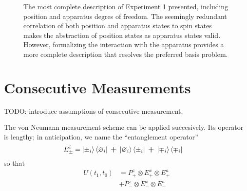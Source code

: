 \begin{figure}
\centering\CaptionFontSize
{}
\caption[Insert an abbreviated caption here to show in the List of Figures]
{The most complete description of Experiment 1 presented, including position and apparatus degres of freedom. The seemingly redundant correlation of both position and apparatus states to spin states makes the abstraction of position states as apparatus states valid. However, formalizing the interaction with the apparatus provides a more complete description that resolves the preferred basis problem.}
\label{Figure:Measurement:DetectorStates}
\end{figure}

\section{Consecutive Measurements}
TODO: introduce assumptions of consecutive measurement.

The von Neumann measurement scheme can be applied succesively. Its operator is lengthy; in anticipation, we name the ``entanglement operator''
\begin{align}
  E^i_\pm &= \ket{\pm_i}\bra{\varnothing_i} \: \bm{+} \: \ket{\varnothing_i}\bra{\pm_i} \: \bm{+} \: \ket{\mp_i}\bra{\mp_i}
\end{align}
so that
\begin{align}
  U(t_1, t_0) &= P^z_+ \otimes E^x_+ \otimes E^a_+ \\ \nonumber
  &+ P^z_- \otimes E^x_- \otimes E^a_-
\end{align}

